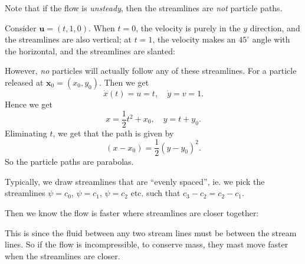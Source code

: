 \documentclass[a4paper]{article}
\begin{document}
Note that if the flow is \emph{unsteady}, then the streamlines are \emph{not} particle paths.
\begin{eg}
  Consider $\mathbf{u} = (t, 1, 0)$. When $t = 0$, the velocity is purely in the $y$ direction, and the streamlines are also vertical; at $t = 1$, the velocity makes an $45^\circ$ angle with the horizontal, and the streamlines are slanted:
  \begin{center}
  \end{center}
  However, \emph{no} particles will actually follow any of these streamlines. For a particle released at $\mathbf{x}_0 = (x_0, y_0)$. Then we get
  \[
    \dot{x}(t) = u = t,\quad \dot{y} = v = 1.
  \]
  Hence we get
  \[
    x = \frac{1}{2}t^2 + x_0,\quad y = t + y_0.
  \]
  Eliminating $t$, we get that the path is given by
  \[
    (x - x_0) = \frac{1}{2}(y - y_0)^2.
  \]
  So the particle paths are parabolas.
\end{eg}
Typically, we draw streamlines that are ``evenly spaced'', ie. we pick the streamlines $\psi = c_0$, $\psi = c_1$, $\psi = c_2$ etc. such that $c_3 - c_2 = c_2 - c_1$.

Then we know the flow is faster where streamlines are closer together:
\begin{center}
\end{center}
This is since the fluid between any two stream lines must be between the stream lines. So if the flow is incompressible, to conserve mass, they mast move faster when the streamlines are closer.
\end{document}
